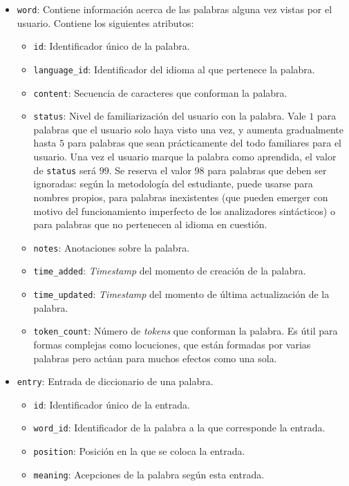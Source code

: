 \begin{itemize}
\begin{itemize}[label=$\star$]
		\end{itemize}
	\item \texttt{word}: Contiene información acerca de las palabras alguna vez vistas por el usuario. Contiene los siguientes atributos:
	\begin{itemize}[label=$\star$]
		\item \texttt{id}: Identificador único de la palabra.
		\item \texttt{language\_id}: Identificador del idioma al que pertenece la palabra.
		\item \texttt{content}: Secuencia de caracteres que conforman la palabra.
		\item \texttt{status}: Nivel de familiarización del usuario con la palabra. Vale $1$ para palabras que el usuario solo haya visto una vez, y aumenta gradualmente hasta $5$ para palabras que sean prácticamente del todo familiares para el usuario. Una vez el usuario marque la palabra como aprendida, el valor de \texttt{status} será $99$. Se reserva el valor $98$ para palabras que deben ser ignoradas: según la metodología del estudiante, puede usarse para nombres propios, para palabras inexistentes (que pueden emerger con motivo del funcionamiento imperfecto de los analizadores sintácticos) o para palabras que no pertenecen al idioma en cuestión.
		\item \texttt{notes}: Anotaciones sobre la palabra.
		\item \texttt{time\_added}: \textit{Timestamp} del momento de creación de la palabra.
		\item \texttt{time\_updated}: \textit{Timestamp} del momento de última actualización de la palabra.
		\item \texttt{token\_count}: Número de \textit{tokens} que conforman la palabra. Es útil para formas complejas como locuciones, que están formadas por varias palabras pero actúan para muchos efectos como una sola.
	\end{itemize}
	\item \texttt{entry}: Entrada de diccionario de una palabra.
	\begin{itemize}[label=$\star$]
		\item \texttt{id}: Identificador único de la entrada.
		\item \texttt{word\_id}: Identificador de la palabra a la que corresponde la entrada.
		\item \texttt{position}: Posición en la que se coloca la entrada.
		\item \texttt{meaning}: Acepciones de la palabra según esta entrada.

\end{itemize}
\end{itemize}
